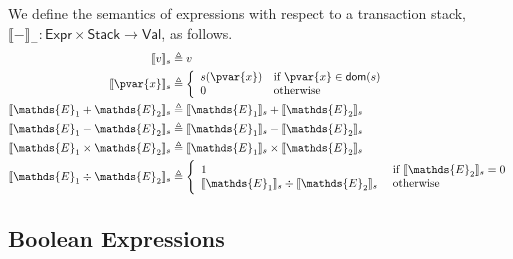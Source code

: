 We define the semantics of expressions with respect to a transaction stack, $\llbracket - \rrbracket_- : \mathsf{Expr} \times \mathsf{Stack} \rightarrow \mathsf{Val}$, as follows.
\begin{align*}
\llbracket v \rrbracket_s &\triangleq v \\
\llbracket \pvar{x} \rrbracket_s &\triangleq
\bigg\{ \begin{array}{l l}
s(\pvar{x}) &\text{if } \pvar{x} \in \textsf{dom}(s)\\
0&\text{otherwise}
\end{array} \\
\llbracket \mathds{E}_1 + \mathds{E}_2 \rrbracket_s &\triangleq \llbracket \mathds{E}_1 \rrbracket_s + \llbracket \mathds{E}_2 \rrbracket_s \\
\llbracket \mathds{E}_1 - \mathds{E}_2 \rrbracket_s &\triangleq \llbracket \mathds{E}_1 \rrbracket_s - \llbracket \mathds{E}_2 \rrbracket_s \\
\llbracket \mathds{E}_1 \times \mathds{E}_2 \rrbracket_s &\triangleq \llbracket \mathds{E}_1 \rrbracket_s \times \llbracket \mathds{E}_2 \rrbracket_s \\
\llbracket \mathds{E}_1 \div \mathds{E}_2 \rrbracket_s &\triangleq 
\Bigg\{ \begin{array}{l l}
1 &\text{ if } \llbracket \mathds{E}_2 \rrbracket_s = 0 \\
\llbracket \mathds{E}_1 \rrbracket_s \div \llbracket \mathds{E}_2 \rrbracket_s &\text{ otherwise} \\
\end{array}
\end{align*}

\subsection{Boolean Expressions}

